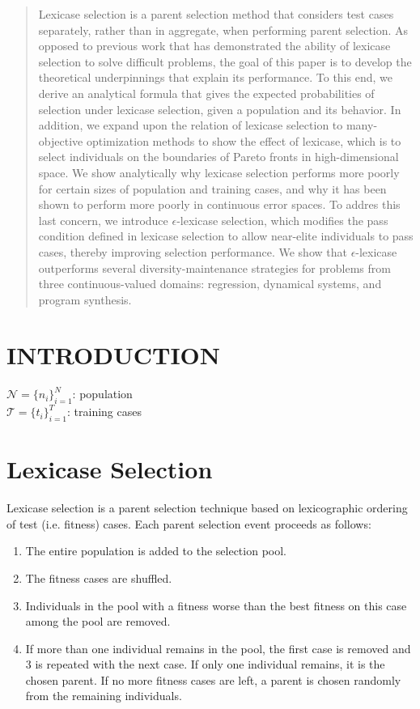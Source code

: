 \documentclass[preprint]{article}
\begin{document}
\maketitle
\begin{abstract}
Lexicase selection is a parent selection method that considers test cases separately, rather than in aggregate, when performing parent selection. As opposed to previous work that has demonstrated the ability of lexicase selection to solve difficult problems, the goal of this paper is to develop the theoretical underpinnings that explain its performance. To this end, we derive an analytical formula that gives the expected probabilities of selection under lexicase selection, given a population and its behavior. In addition, we expand upon the relation of lexicase selection to many-objective optimization methods to show the effect of lexicase, which is to select individuals on the boundaries of Pareto fronts in high-dimensional space. We show analytically why lexicase selection performs more poorly for certain sizes of population and training cases, and why it has been shown to perform more poorly in continuous error spaces. To addres this last concern, we introduce $\epsilon$-lexicase selection, which modifies the pass condition defined in lexicase selection to allow near-elite individuals to pass cases, thereby improving selection performance. We show that $\epsilon$-lexicase outperforms several diversity-maintenance strategies for problems from three continuous-valued domains: regression, dynamical systems, and program synthesis.
\end{abstract}


\section{INTRODUCTION}
  
\noindent $\mathcal{N} = \{n_i\}_{i=1}^N$: population \\
$\mathcal{T} = \{t_i\}_{i=1}^T$: training cases\\

\section{Lexicase Selection}\label{s:2}
Lexicase selection is a parent selection technique based on lexicographic ordering of test (i.e. fitness) cases.  Each parent selection event proceeds as follows: 

\begin{enumerate}
\item The entire population is added to the selection pool.
\item The fitness cases are shuffled.
\item Individuals in the pool with a fitness worse than the best fitness on this case among the pool are removed. 
\item If more than one individual remains in the pool, the first case is removed and 3 is repeated with the next case. If only one individual remains, it is the chosen parent. If no more fitness cases are left, a parent is chosen randomly from the remaining individuals. 
\end{enumerate}
\end{document}
